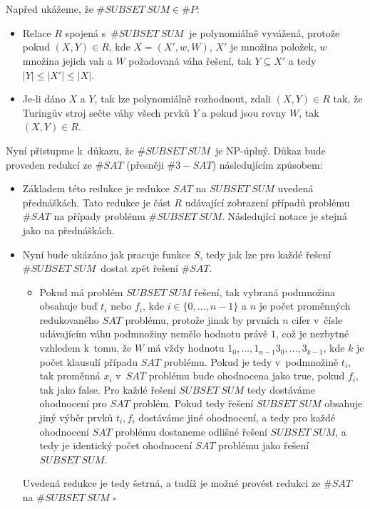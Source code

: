 \documentclass[a4paper]{article}
\newcommand{\sbs}{\# SUBSET\ SUM}
\begin{document}
\section*{}
Napřed ukážeme, že $\sbs \in \#P$:
\begin{itemize}
    \item Relace $R$ spojená s~$\sbs\ $ je polynomiálně vyvážená, protože pokud
    $(X,Y) \in R$, kde $X=(X',w,W)$, $X'$ je množina položek, $w$ množina jejich vah a $W$ požadovaná váha řešení,
    tak $Y \subseteq X'$ a tedy $|Y| \leq |X'| \leq |X|$.
    \item Je-li dáno $X$ a $Y$, tak lze polynomiálně rozhodnout, zdali $(X,Y)\in R$ tak,
    že Turingův stroj sečte váhy všech prvků $Y$ a pokud jsou rovny $W$, tak $(X,Y)\in R$.
\end{itemize}
Nyní přistupme k~důkazu, že $\sbs$\ je NP-úplný.
Důkaz bude proveden redukcí ze $\#SAT$ (přesněji $\# 3-SAT$) následujícím způsobem:
\begin{itemize}
 \item Základem této redukce je redukce $SAT$ na $SUBSET\ SUM$ uvedená přednáškách.
 Tato redukce je část $R$ udávající zobrazení případů problému $\# SAT$ na případy problému $\sbs$.
 Následující notace je stejná jako na přednáškách.
 \item Nyní bude ukázáno jak pracuje funkce $S$, tedy jak lze pro každé řešení $\sbs$\ dostat zpět řešení $\# SAT$.
 \begin{itemize}
    \item Pokud má problém $SUBSET\ SUM$ řešení, tak vybraná podmnožina obsahuje buď $t_i$ nebo $f_i$, kde $i\in\{0,\ldots,n-1\}$ a
    $n$ je počet proměnných redukovaného $SAT$ problému, protože jinak by prvních $n$ cifer v~čísle udávajícím váhu
    podmnožiny nemělo hodnotu právě $1$, což je nezbytné vzhledem k~tomu, že $W$ má vždy hodnotu $1_0,\ldots,1_{n-1}3_0, \ldots,
    3_{k-1}$, kde $k$ je počet klausulí případu $SAT$ problému.
    Pokud je tedy v~podmnožině $t_i$, tak proměnná $x_i$ v~$SAT$ problému bude ohodnocena jako true, pokud $f_i$, tak jako false.
    Pro každé řešení $SUBSET\ SUM$ tedy dostáváme ohodnocení pro $SAT$ problém.
    Pokud tedy řešení $SUBSET\ SUM$ obsahuje jiný výběr prvků $t_i, f_i$ dostáváme jiné ohodnocení, a tedy pro každé
    ohodnocení $SAT$ problému dostaneme odlišné řešení $SUBSET\ SUM$, a tedy je identický počet ohodnocení $SAT$ problému
    jako řešení $SUBSET\ SUM$.
 \end{itemize}
Uvedená redukce je tedy šetrná, a tudíž je možné provést redukci ze $\#SAT$ na $\sbs$ $\square$
\end{itemize}
\end{document}
